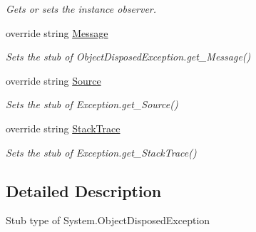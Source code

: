 \begin{DoxyCompactItemize}
\begin{DoxyCompactList}\small\item\em Gets or sets the instance observer.\end{DoxyCompactList}\item 
override string \hyperlink{class_system_1_1_fakes_1_1_stub_object_disposed_exception_affc04d881945745bc9574b258177152e}{Message}
\begin{DoxyCompactList}\small\item\em Sets the stub of Object\-Disposed\-Exception.\-get\-\_\-\-Message()\end{DoxyCompactList}\item 
override string \hyperlink{class_system_1_1_fakes_1_1_stub_object_disposed_exception_a0deeb7d924fa86b7b2199df7bcdaeb90}{Source}
\begin{DoxyCompactList}\small\item\em Sets the stub of Exception.\-get\-\_\-\-Source()\end{DoxyCompactList}\item 
override string \hyperlink{class_system_1_1_fakes_1_1_stub_object_disposed_exception_a3133d41f6cf23fdbf8f8530b388150c8}{Stack\-Trace}
\begin{DoxyCompactList}\small\item\em Sets the stub of Exception.\-get\-\_\-\-Stack\-Trace()\end{DoxyCompactList}\end{DoxyCompactItemize}


\subsection{Detailed Description}
Stub type of System.\-Object\-Disposed\-Exception



